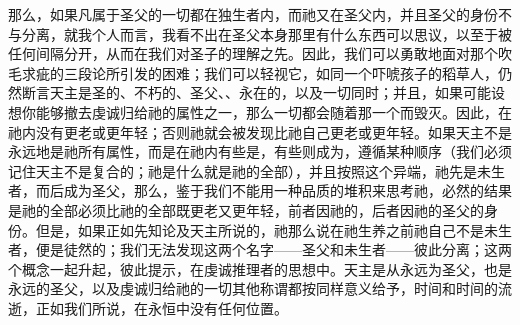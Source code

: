那么，如果凡属于圣父的一切都在独生者内，而祂又在圣父内，并且圣父的身份不与分离，就我个人而言，我看不出在圣父本身那里有什么东西可以思议，以至于被任何间隔分开，从而在我们对圣子的理解之先。因此，我们可以勇敢地面对那个吹毛求疵的三段论所引发的困难；我们可以轻视它，如同一个吓唬孩子的稻草人，仍然断言天主是圣的、不朽的、圣父、、永在的，以及一切同时；并且，如果可能设想你能够撤去虔诚归给祂的属性之一，那么一切都会随着那一个而毁灭。因此，在祂内没有更老或更年轻；否则祂就会被发现比祂自己更老或更年轻。如果天主不是永远地是祂所有属性，而是在祂内有些是，有些则成为，遵循某种顺序（我们必须记住天主不是复合的；祂是什么就是祂的全部），并且按照这个异端，祂先是未生者，而后成为圣父，那么，鉴于我们不能用一种品质的堆积来思考祂，必然的结果是祂的全部必须比祂的全部既更老又更年轻，前者因祂的，后者因祂的圣父的身份。但是，如果正如先知论及天主所说的，祂那么说在祂生养之前祂自己不是未生者，便是徒然的；我们无法发现这两个名字——圣父和未生者——彼此分离；这两个概念一起升起，彼此提示，在虔诚推理者的思想中。天主是从永远为圣父，也是永远的圣父，以及虔诚归给祂的一切其他称谓都按同样意义给予，时间和时间的流逝，正如我们所说，在永恒中没有任何位置。\par

